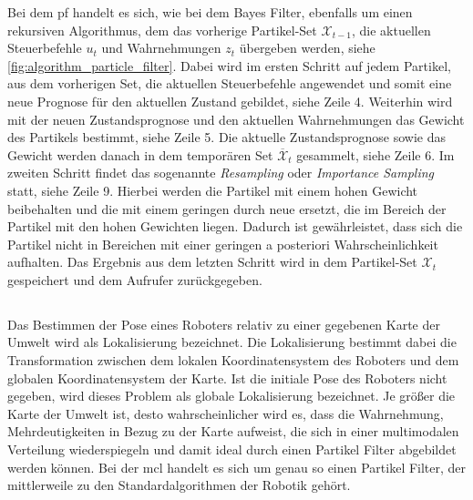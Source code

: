 Bei dem \Gls{pf} handelt es sich, wie bei dem Bayes Filter, ebenfalls um einen rekursiven Algorithmus, dem das vorherige Partikel-Set $\mathcal{X}_{t-1}$, die aktuellen Steuerbefehle $u_t$ und Wahrnehmungen $z_t$ übergeben werden, siehe \autoref{fig:algorithm_particle_filter}. Dabei wird im ersten Schritt auf jedem Partikel, aus dem vorherigen Set, die aktuellen Steuerbefehle angewendet und somit eine neue Prognose für den aktuellen Zustand gebildet, siehe Zeile 4. Weiterhin wird mit der neuen Zustandsprognose und den aktuellen Wahrnehmungen das Gewicht des Partikels bestimmt, siehe Zeile 5. Die aktuelle Zustandsprognose sowie das Gewicht werden danach in dem temporären Set $\overline{\mathcal{X}}_t$ gesammelt, siehe Zeile 6. Im zweiten Schritt findet das sogenannte \textit{Resampling} oder \textit{Importance Sampling} statt, siehe Zeile 9. Hierbei werden die Partikel mit einem hohen Gewicht beibehalten und die mit einem geringen durch neue ersetzt, die im Bereich der Partikel mit den hohen Gewichten liegen. Dadurch ist gewährleistet, dass sich die Partikel nicht in Bereichen mit einer geringen a posteriori Wahrscheinlichkeit aufhalten. Das Ergebnis aus dem letzten Schritt wird in dem Partikel-Set $\mathcal{X}_t$ gespeichert und dem Aufrufer zurückgegeben.

\begin{figure}
	\centering
	\label{fig:algorithm_particle_filter}
\end{figure}


%
%
\subsection{}

Das Bestimmen der Pose eines Roboters relativ zu einer gegebenen Karte der Umwelt wird als Lokalisierung bezeichnet. Die Lokalisierung bestimmt dabei die Transformation zwischen dem lokalen Koordinatensystem des Roboters und dem globalen Koordinatensystem der Karte. Ist die initiale Pose des Roboters nicht gegeben, wird dieses Problem als globale Lokalisierung bezeichnet. Je größer die Karte der Umwelt ist, desto wahrscheinlicher wird es, dass die Wahrnehmung, Mehrdeutigkeiten in Bezug zu der Karte aufweist, die sich in einer multimodalen Verteilung wiederspiegeln und damit ideal durch einen Partikel Filter abgebildet werden können. Bei der \Gls{mcl} handelt es sich um genau so einen Partikel Filter, der mittlerweile zu den Standardalgorithmen der Robotik gehört.

